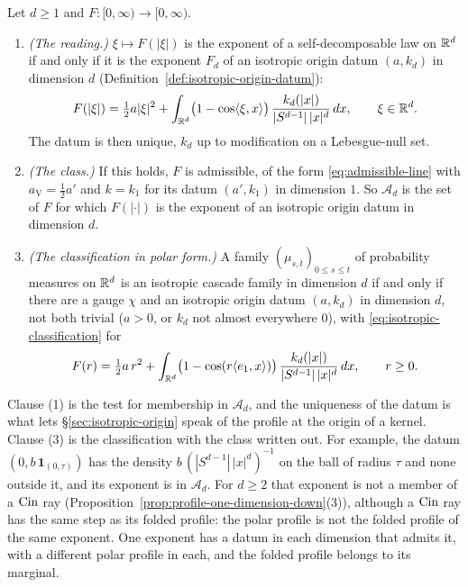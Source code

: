 \begin{proposition}\label{prop:isotropic-polar-reading}
Let $d \ge 1$ and $F : [0,\infty) \to [0,\infty)$.
\begin{enumerate}
\item \emph{(The reading.)} $\xi \mapsto F(|\xi|)$ is the exponent of a self-decomposable law on
$\mathbb{R}^d$ if and only if it is the exponent $F_d$ of an isotropic origin datum $(a,k_d)$ in
dimension $d$ (Definition~\ref{def:isotropic-origin-datum}):
\[
  F(|\xi|) = \tfrac12 a|\xi|^2 + \int_{\mathbb{R}^d}\bigl(1 - \cos\langle\xi,x\rangle\bigr)\,
    \frac{k_d(|x|)}{|S^{d-1}|\,|x|^d}\,dx , \qquad \xi \in \mathbb{R}^d .
\]
The datum is then unique, $k_d$ up to modification on a Lebesgue-null set.
\item \emph{(The class.)} If this holds, $F$ is admissible, of the form
\ref{eq:admissible-line} with $a_{\mathrm V} = \tfrac12 a'$ and $k = k_1$ for its datum
$(a',k_1)$ in dimension $1$. So $\mathcal{A}_d$ is the set of $F$ for which $F(|\cdot|)$ is the
exponent of an isotropic origin datum in dimension $d$.
\item \emph{(The classification in polar form.)} A family $(\mu_{s,t})_{0 \le s \le t}$ of
probability measures on $\mathbb{R}^d$ is an isotropic cascade family in dimension $d$ if and only if
there are a gauge $\chi$ and an isotropic origin datum $(a,k_d)$ in dimension $d$, not both trivial
($a > 0$, or $k_d$ not almost everywhere $0$), with \ref{eq:isotropic-classification} for
\[
  F(r) = \tfrac12 a\,r^2 + \int_{\mathbb{R}^d}\bigl(1 - \cos(r\langle e_1,x\rangle)\bigr)\,
    \frac{k_d(|x|)}{|S^{d-1}|\,|x|^d}\,dx , \qquad r \ge 0 .
\]
\end{enumerate}
\end{proposition}

Clause (1) is the test for membership in $\mathcal{A}_d$, and the uniqueness of the datum is what
lets \S\ref{sec:isotropic-origin} speak of the profile at the origin of a kernel. Clause (3) is
the classification with the class written out. For example, the datum
$(0, b\,\mathbf{1}_{(0,\tau)})$ has the \Levy{} density $b\,(|S^{d-1}|\,|x|^d)^{-1}$ on the ball
of radius $\tau$ and none outside it, and its exponent is in $\mathcal{A}_d$. For $d \ge 2$ that
exponent is not a member of a $\operatorname{Cin}$ ray
(Proposition~\ref{prop:profile-one-dimension-down}(3)), although a $\operatorname{Cin}$ ray has the same step
as its folded profile: the polar profile is not the folded profile of the same exponent. One exponent has a
datum in each
dimension that admits it, with a different polar profile in each, and the folded profile belongs
to its marginal.

